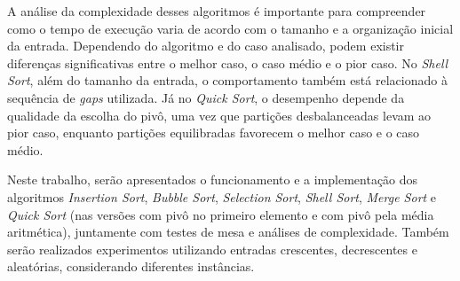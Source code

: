\quad A análise da complexidade desses algoritmos é importante para compreender como o tempo de execução varia de acordo com o tamanho e a organização inicial da entrada. Dependendo do algoritmo e do caso analisado, podem existir diferenças significativas entre o melhor caso, o caso médio e o pior caso. No \textit{Shell Sort}, além do tamanho da entrada, o comportamento também está relacionado à sequência de \textit{gaps} utilizada. Já no \textit{Quick Sort}, o desempenho depende da qualidade da escolha do pivô, uma vez que partições desbalanceadas levam ao pior caso, enquanto partições equilibradas favorecem o melhor caso e o caso médio.

\quad Neste trabalho, serão apresentados o funcionamento e a implementação dos algoritmos \textit{Insertion Sort}, \textit{Bubble Sort}, \textit{Selection Sort}, \textit{Shell Sort}, \textit{Merge Sort} e \textit{Quick Sort} (nas versões com pivô no primeiro elemento e com pivô pela média aritmética), juntamente com testes de mesa e análises de complexidade. Também serão realizados experimentos utilizando entradas crescentes, decrescentes e aleatórias, considerando diferentes instâncias.